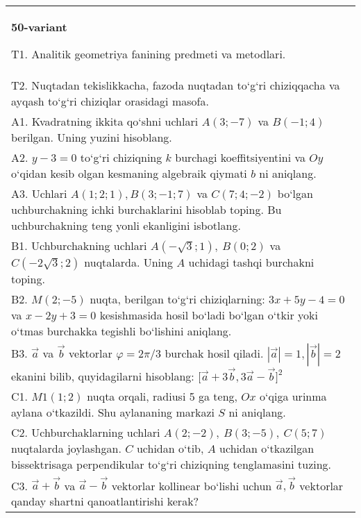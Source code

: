 \documentclass{article}
\begin{document}
\begin{tabular}{m{17cm}}
\textbf{50-variant}
\newline

T1. Analitik geometriya fanining predmeti va metodlari.
 \\
T2. 
Nuqtadan tekislikkacha, fazoda nuqtadan to‘g‘ri chiziqqacha va ayqash to‘g‘ri chiziqlar orasidagi masofa. \\
A1. 
Kvadratning ikkita qo‘shni uchlari $A (3; -7)$ va
$B (-1;4) $ berilgan. Uning yuzini hisoblang.
 \\
A2. 
$y-3=0$ to‘g‘ri chiziqning $k$ burchagi
koeffitsiyentini va $Oy$ o‘qidan kesib olgan kesmaning algebraik
qiymati $b$ ni aniqlang.
 \\
A3. 
Uchlari $A (1;2;1), B (3;-1;7) $ va $C (7;4;-2) $ bo‘lgan uchburchakning
ichki burchaklarini hisoblab toping. Bu uchburchakning teng yonli ekanligini isbotlang.
 \\
B1. 
Uchburchakning uchlari
\(A\left(-\sqrt{3};1 \right),\ B (0;2) \) va
\(C\left(-2\sqrt{3};2 \right) \) nuqtalarda. Uning $A$
uchidagi tashqi burchakni toping.
 \\
B2. 
\(M (2;-5) \) nuqta, berilgan to‘g‘ri chiziqlarning:
\(3x+5y-4=0\) va \(x-2y+3=0\) kesishmasida hosil bo‘ladi
bo‘lgan o‘tkir yoki o‘tmas burchakka tegishli bo‘lishini aniqlang.
 \\
B3. 
$\vec{a}$ va $\vec{b}$ vektorlar $\varphi = 2\pi/3$ burchak hosil qiladi. $|\vec{a}| = 1,|\vec{b}| = 2$ ekanini bilib, quyidagilarni hisoblang:
$\lbrack\overrightarrow{a} + 3\overrightarrow{b},3\overrightarrow{a} - \overrightarrow{b}\rbrack^{2}$
 \\
C1. 
\(M{1} (1; 2) \) nuqta orqali, radiusi 5 ga teng,
$Ox$ o‘qiga urinma aylana o‘tkazildi. Shu aylananing markazi
$S$ ni aniqlang.
 \\
C2. 
Uchburchaklarning uchlari
\(A (2; - 2),\ B (3; - 5),\ C (5;7) \) nuqtalarda joylashgan. $C$
uchidan o‘tib, $A$ uchidan o‘tkazilgan bissektrisaga
perpendikular to‘g‘ri chiziqning tenglamasini tuzing.
 \\
C3. 
\(\vec{a}+\vec{b}\) va \(\vec{a} - \vec{b}\) vektorlar kollinear bo‘lishi uchun \(\vec{a},\vec{b}\) vektorlar qanday shartni qanoatlantirishi kerak?
 \\

\end{tabular}
\vspace{1cm}
\end{document}
